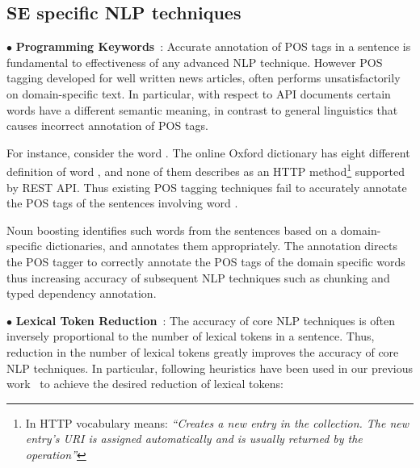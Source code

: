 

\subsection{SE specific NLP techniques}
\label{sub:SENLPback}

{\small $\bullet$} \textbf{Programming Keywords}~\cite{pandita12:inferring}: Accurate annotation of POS tags in a sentence is fundamental to effectiveness of any advanced NLP technique.
However POS tagging developed for well written news articles, often performs unsatisfactorily on domain-specific text.
In particular, with respect to API documents certain words have a different semantic meaning, in contrast to general linguistics that causes incorrect annotation of POS tags.

For instance, consider the word . 
The online Oxford dictionary %
has eight different definition of word , and none of them describes  as an HTTP method\footnote{In HTTP vocabulary  means: \textit{``Creates a new entry in the collection.
The new entry's URI is assigned automatically and is usually returned by the operation''}}
supported by REST API.
Thus existing POS tagging techniques fail to accurately annotate the POS tags of the sentences involving word .  

Noun boosting identifies such words from the sentences based on a domain-specific dictionaries, and annotates them appropriately.
The annotation directs the POS tagger to correctly annotate the POS tags of the domain specific words thus increasing accuracy of subsequent NLP techniques such as chunking and typed dependency annotation.

{\small $\bullet$} \textbf{Lexical Token Reduction}~\cite{pandita13:WHYPER}:
The accuracy of core NLP techniques is often inversely proportional to the number of lexical tokens in a sentence.
Thus, reduction in the number of lexical tokens greatly improves the accuracy of core NLP techniques. 
In particular, following heuristics have been used in our previous work~\cite{pandita12:inferring,pandita13:WHYPER} to achieve the desired reduction of lexical tokens:

